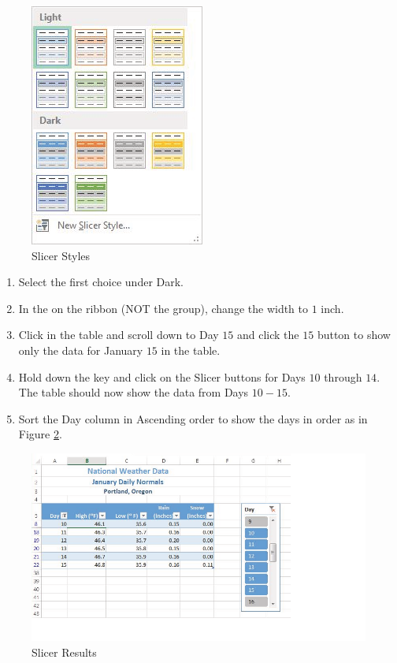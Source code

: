 \begin{figure}[H]
	\centering
	\includegraphics[width=\maxwidth{.95\linewidth}]{gfx/ch05_fig20}
	\caption{Slicer Styles}
	\label{05:fig20}
\end{figure}

\begin{enumerate}
	\item Select the first choice under Dark.
	\item In the  on the  ribbon (NOT the  group), change the width to $ 1 $ inch.
	\item Click in the table and scroll down to Day $ 15 $ and click the $ 15 $ button to show only the data for January $ 15 $ in the table.
	\item Hold down the  key and click on the Slicer buttons for Days $ 10 $ through $ 14 $. The table should now show the data from Days $ 10-15 $.
	\item Sort the Day column in Ascending order to show the days in order as in Figure \ref{05:fig21}.
\end{enumerate}

\begin{figure}[H]
	\centering
	\includegraphics[width=\maxwidth{.95\linewidth}]{gfx/ch05_fig21}
	\caption{Slicer Results}
	\label{05:fig21}
\end{figure}


